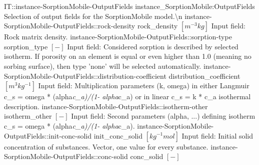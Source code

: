 \begin{SelectionType}
	{IT::instance-SorptionMobile-OutputFields}
	{instance{\_}SorptionMobile:OutputFields}
	{{{Selection of output fields for the SorptionMobile model.{\textbackslash}n}%
}}
		\SelectionItem
			{instance-SorptionMobile-OutputFields::rock-density}
			{rock{\_}density}
			{{{}{$[m^{-3}kg]$}{ Input field: Rock matrix density.}%
}}
		\SelectionItem
			{instance-SorptionMobile-OutputFields::sorption-type}
			{sorption{\_}type}
			{{{}{$[-]$}{ Input field: Considered sorption is described by selected isotherm.
If porosity on an element is equal or even higher than 1.0 (meaning no sorbing surface), then type 'none' will be selected automatically.}%
}}
		\SelectionItem
			{instance-SorptionMobile-OutputFields::distribution-coefficient}
			{distribution{\_}coefficient}
			{{{}{$[m^{3}kg^{-1}]$}{ Input field: Multiplication parameters (k, omega) in either Langmuir c{\_}s = omega * (alpha}\textit{c{\_}a)/(1- alpha}{c{\_}a) or in linear c{\_}s = k * c{\_}a isothermal description.}%
}}
		\SelectionItem
			{instance-SorptionMobile-OutputFields::isotherm-other}
			{isotherm{\_}other}
			{{{}{$[-]$}{ Input field: Second parameters (alpha, ...) defining isotherm  c{\_}s = omega * (alpha}\textit{c{\_}a)/(1- alpha}{c{\_}a).}%
}}
		\SelectionItem
			{instance-SorptionMobile-OutputFields::init-conc-solid}
			{init{\_}conc{\_}solid}
			{{{}{$[kg^{-1}mol]$}{ Input field: Initial solid concentration of substances.
Vector, one value for every substance.}%
}}
		\SelectionItem
			{instance-SorptionMobile-OutputFields::conc-solid}
			{conc{\_}solid}
			{{{}{$[-]$}{ }%
}}
\end{SelectionType}

